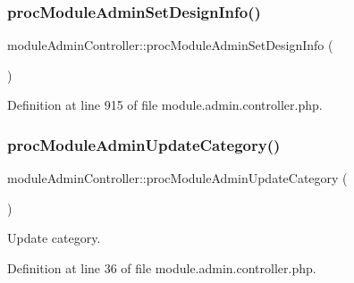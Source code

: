 \hypertarget{classmoduleAdminController_ae54d4745ef9b34c46bb3c8943314ee8d}{}\label{classmoduleAdminController_ae54d4745ef9b34c46bb3c8943314ee8d} 
\subsubsection{\texorpdfstring{proc\+Module\+Admin\+Set\+Design\+Info()}{procModuleAdminSetDesignInfo()}}
{\footnotesize\ttfamily module\+Admin\+Controller\+::proc\+Module\+Admin\+Set\+Design\+Info (\begin{DoxyParamCaption}{ }\end{DoxyParamCaption})}



Definition at line 915 of file module.\+admin.\+controller.\+php.

\hypertarget{classmoduleAdminController_a75e4a9dfbc37befe7ab2758c62322821}{}\label{classmoduleAdminController_a75e4a9dfbc37befe7ab2758c62322821} 
\subsubsection{\texorpdfstring{proc\+Module\+Admin\+Update\+Category()}{procModuleAdminUpdateCategory()}}
{\footnotesize\ttfamily module\+Admin\+Controller\+::proc\+Module\+Admin\+Update\+Category (\begin{DoxyParamCaption}{ }\end{DoxyParamCaption})}



Update category. 



Definition at line 36 of file module.\+admin.\+controller.\+php.

\hypertarget{classmoduleAdminController_a299f612ff66da380ee8633fd8d79f777}{}\label{classmoduleAdminController_a299f612ff66da380ee8633fd8d79f777} 
